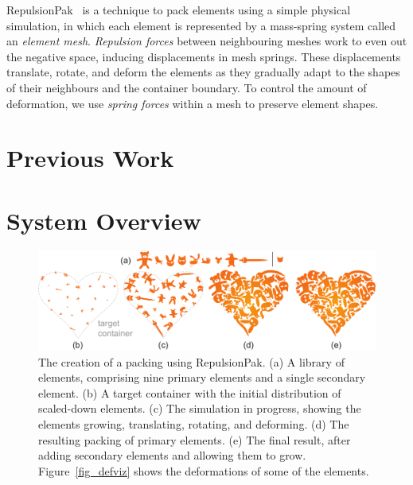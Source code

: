 \newtext
{
RepulsionPak~\cite{Saputra2018, Saputra2019} is a technique
to pack elements using a simple physical simulation, 
in which each element is represented
by a mass-spring system called an \textit{element mesh}.  
\textit{Repulsion forces} between neighbouring meshes work to even out the negative
space, inducing displacements in mesh springs.
These displacements translate, rotate, and deform the elements as 
they gradually adapt to the shapes of their neighbours
and the container boundary.  
To control the amount of deformation,
we use \textit{spring forces} within a mesh to preserve element shapes.
}




\section{Previous Work}
\label{repulsionpak_previous_work}



\section{System Overview}
\label{repulsionpak_system_overview}




\begin{figure}[h]
\centering
\includegraphics[width=1.0\textwidth]{figures/repulsionpak/pipeline.pdf} 
\caption[RepulsionPak pipeline]
{\label{fig_repulsionpak_pipeline} 
The creation of a packing using RepulsionPak.
  (a) A library of elements, comprising nine primary elements and a single
  	secondary element.
  (b) A target container with the initial distribution of scaled-down elements.
  (c) The simulation in progress, showing the elements growing, translating,
  	rotating, and deforming.
  (d) The resulting packing of primary elements.
  (e) The final result, after adding secondary elements and allowing them to
  	grow.
  	Figure~\ref{fig_defviz} shows the deformations of some of the elements. }
\end{figure}

